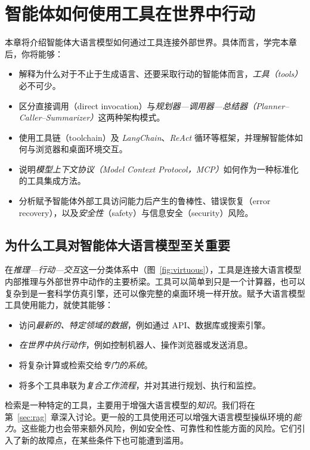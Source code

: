 \chapter{智能体如何使用工具在世界中行动}
\label{sec:tools}\label{chap:tools}

\begin{learningbox}
本章将介绍智能体大语言模型如何通过工具连接外部世界。具体而言，学完本章后，你将能够：
\begin{itemize}[leftmargin=*, nosep]
    \item 解释为什么对于不止于生成语言、还要采取行动的智能体而言，{\em 工具（tools）}必不可少。
    \item 区分直接调用（direct invocation）与{\em 规划器—调用器—总结器（Planner--Caller--Summarizer）}这两种架构模式。
    \item 使用工具链（toolchain）及 \textit{LangChain}、\textit{ReAct} 循环等框架，并理解智能体如何与浏览器和桌面环境交互。
    \item 说明\textit{模型上下文协议（Model Context Protocol，MCP）}如何作为一种标准化的工具集成方法。
    \item 分析赋予智能体外部工具访问能力后产生的鲁棒性、错误恢复（error recovery），以及{\em 安全性}（safety）与信息安全（security）风险。
\end{itemize}
\end{learningbox}

\section{为什么工具对智能体大语言模型至关重要}
在\textit{推理—行动—交互}这一分类体系中（图~\ref{fig:virtuous}），工具是连接大语言模型内部推理与外部世界中动作的主要桥梁。工具可以简单到只是一个计算器，也可以复杂到是一套科学仿真引擎，还可以像完整的桌面环境一样开放。赋予大语言模型工具使用能力，就使其能够：

\begin{itemize}
    \item 访问\textit{最新的、特定领域的数据}，例如通过 API、数据库或搜索引擎。
    \item \textit{在世界中执行动作}，例如控制机器人、操作浏览器或发送消息。
    \item 将复杂计算或检索交给\textit{专门的系统}。
    \item 将多个工具串联为\textit{复合工作流程}，并对其进行规划、执行和监控。
\end{itemize}
检索是一种特定的工具，主要用于增强大语言模型的\emph{知识}。我们将在第~\ref{sec:rag}~章深入讨论。更一般的工具使用还可以增强大语言模型操纵环境的\emph{能力}。这些能力也会带来额外风险，例如安全性、可靠性和性能方面的风险。它们引入了新的故障点，在某些条件下也可能遭到滥用。




